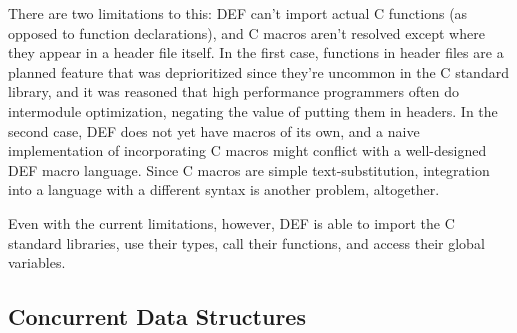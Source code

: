 There are two limitations to this: DEF can't import actual C functions (as opposed to function declarations), and C macros aren't resolved except where they appear in a header file itself.  In the first case, functions in header files are a planned feature that was deprioritized since they're uncommon in the C standard library, and it was reasoned that high performance programmers often do intermodule optimization, negating the value of putting them in headers.  In the second case, DEF does not yet have macros of its own, and a naive implementation of incorporating C macros might conflict with a well-designed DEF macro language.  Since C macros are simple text-substitution, integration into a language with a different syntax is another problem, altogether.

Even with the current limitations, however, DEF is able to import the C standard libraries, use their types, call their functions, and access their global variables.

\subsection{Concurrent Data Structures}


